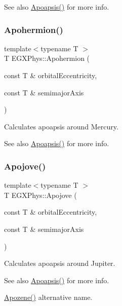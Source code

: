 \begin{DoxySeeAlso}{See also}
\hyperlink{group___e_g_x_phys-_apoapsis_gaf962e650bf84a568458e8eb39b1c61ba}{Apoapsis()} for more info. 
\end{DoxySeeAlso}
\mbox{\label{group___e_g_x_phys-_apoapsis_gab002349e578241b3514f2212da9a7d48}} 
\subsubsection{\texorpdfstring{Apohermion()}{Apohermion()}}
{\footnotesize\ttfamily template$<$typename T $>$ \\
T E\+G\+X\+Phys\+::\+Apohermion (\begin{DoxyParamCaption}\item[{const T \&}]{orbital\+Eccentricity,  }\item[{const T \&}]{semimajor\+Axis }\end{DoxyParamCaption})}



Calculates apoapsis around Mercury. 

\begin{DoxySeeAlso}{See also}
\hyperlink{group___e_g_x_phys-_apoapsis_gaf962e650bf84a568458e8eb39b1c61ba}{Apoapsis()} for more info. 
\end{DoxySeeAlso}
\mbox{\label{group___e_g_x_phys-_apoapsis_ga5a45d0a873514113aaa0adc95aefbbde}} 
\subsubsection{\texorpdfstring{Apojove()}{Apojove()}}
{\footnotesize\ttfamily template$<$typename T $>$ \\
T E\+G\+X\+Phys\+::\+Apojove (\begin{DoxyParamCaption}\item[{const T \&}]{orbital\+Eccentricity,  }\item[{const T \&}]{semimajor\+Axis }\end{DoxyParamCaption})}



Calculates apoapsis around Jupiter. 

\begin{DoxySeeAlso}{See also}
\hyperlink{group___e_g_x_phys-_apoapsis_gaf962e650bf84a568458e8eb39b1c61ba}{Apoapsis()} for more info. 

\hyperlink{group___e_g_x_phys-_apoapsis_ga44d3dd8d8b350d053b25b7b1f1e15534}{Apozene()} alternative name. 
\end{DoxySeeAlso}
\mbox{\label{group___e_g_x_phys-_apoapsis_ga98557a8d49aa129c29e652c4758334d1}} 
